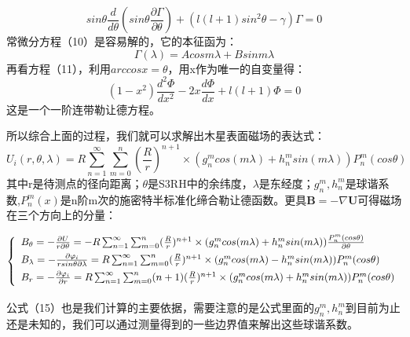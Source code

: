 \documentclass{article}
\begin{document}
\begin{equation}
    sin\theta\frac{d}{d\theta}(sin\theta\frac{\partial{\Gamma}}{\partial\theta})+(l(l+1)sin^2\theta-\gamma)\Gamma=0
\end{equation}
常微分方程（10）是容易解的，它的本征函为：
\begin{equation}
    \Gamma(\lambda)=Acosm\lambda+Bsinm\lambda
\end{equation}
再看方程（11），利用$arccosx=\theta$，用x作为唯一的自变量得：
\begin{equation}
    (1-x^2)\frac{d^2\Phi}{dx^2} - 2x\frac{d\Phi}{dx}+l(l+1)\Phi=0
\end{equation}
这是一个一阶连带勒让德方程。

所以综合上面的过程，我们就可以求解出木星表面磁场的表达式：
\begin{equation}
    U_i(r, \theta,\lambda)=R\sum_{n=1}^{\infty}\sum_{m=0}^{n}(\frac{R}{r})^{n+1}\times(g_{n}^{m}cos(m\lambda)+h_{n}^{m}sin(m\lambda))P^{m}_{n}(cos\theta)
\end{equation}
其中r是待测点的径向距离；$\theta$是S3RH中的余纬度，$\lambda$是东经度；$g_n^m,h_n^m$是球谐系数,$P_n^m(x)$是n阶m次的施密特半标准化缔合勒让德函数。更具$\textbf{B}=-\nabla\textbf{U}$可得磁场在三个方向上的分量：


\begin{equation}
  \left\{
    \begin{array}{l}\vspace{1ex} 
            B_{\theta}=-\frac{\partial{U}}{r\partial\theta}= -R\sum_{n=1}^{\infty}\sum_{m=0}^{n}(\frac{R}{r})^{n+1}\times(g_{n}^{m}cos(m\lambda)+h_{n}^{m}sin(m\lambda))\frac{P^{m}_{n}(cos\theta)}{\partial\theta}\\ \vspace{1ex} 
            B_{\lambda}=-\frac{\partial\varphi_i}{rsin\theta\partial\lambda}=R\sum_{n=1}^{\infty}\sum_{m=0}^{n}(\frac{R}{r})^{n+1}\times(g_{n}^{m}cos(m\lambda)-h_{n}^{m}sin(m\lambda))P^{m}_{n}(cos\theta) \\ \vspace{1ex} 
            B_r = -\frac{\partial\varphi_i}{\partial{r}}=R\sum_{n=1}^{\infty}\sum_{m=0}^{n}(n+1)(\frac{R}{r})^{n+1}\times(g_{n}^{m}cos(m\lambda)+h_{n}^{m}sin(m\lambda))P^{m}_{n}(cos\theta)
            
        \end{array}
\right.
\end{equation}


公式（15）也是我们计算的主要依据，需要注意的是公式里面的$g_n^m,h_n^m$到目前为止还是未知的，我们可以通过测量得到的一些边界值来解出这些球谐系数。
\end{document}
